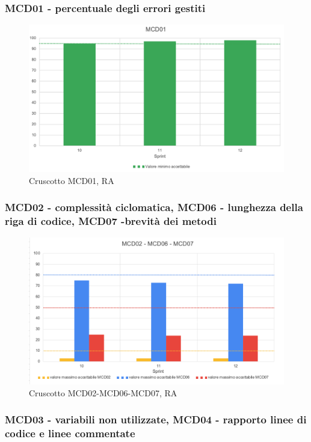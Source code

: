 \subsubsection*{MCD01 - percentuale degli errori gestiti}

\begin{figure}[H] 
    \centering
    \includegraphics[scale = 0.65]{immagini/ImmRA/MCD01.png}
    \caption{Cruscotto MCD01, RA}
\end{figure}

\subsubsection*{MCD02 - complessità ciclomatica, MCD06 - lunghezza della riga di codice, MCD07 -brevità dei metodi }

\begin{figure}[H] 
    \centering
    \includegraphics[scale = 0.8]{immagini/ImmRA/MCD020607.png}
    \caption{Cruscotto MCD02-MCD06-MCD07, RA}
\end{figure}

\subsubsection*{MCD03 - variabili non utilizzate, MCD04 - rapporto linee di codice e linee commentate }

